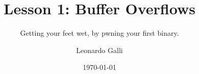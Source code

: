 \documentclass[aspectratio=169]{beamer}
\title{Lesson 1: Buffer Overflows}
\subtitle{Getting your feet wet, by pwning your first binary.}
\author{Leonardo Galli}
\date{\today}
\begin{document}
\titleframe

\tocframe
\end{document}
